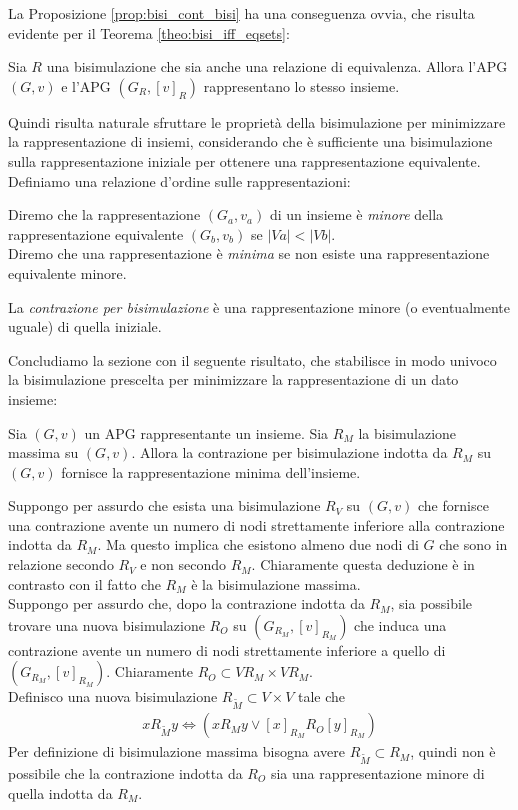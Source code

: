 La Proposizione \ref*{prop:bisi_cont_bisi} ha una conseguenza ovvia, che risulta evidente per il Teorema \ref*{theo:bisi_iff_eqsets}:
\begin{corollary}
    Sia $R$ una bisimulazione che sia anche una relazione di equivalenza. Allora l'APG $(G, v)$ e l'APG $(G_R, [v]_R)$ rappresentano lo stesso insieme.
\end{corollary}
Quindi risulta naturale sfruttare le proprietà della bisimulazione per minimizzare la rappresentazione di insiemi, considerando che è sufficiente una bisimulazione sulla rappresentazione iniziale per ottenere una rappresentazione equivalente. Definiamo una relazione d'ordine sulle rappresentazioni:
\begin{definition}
    Diremo che la rappresentazione $(G_a, v_a)$ di un insieme è \emph{minore} della rappresentazione equivalente $(G_b, v_b)$ se $|Va| < |Vb|$.\\
    Diremo che una rappresentazione è \emph{minima} se non esiste una rappresentazione equivalente minore.
\end{definition}
\begin{observation}
    La \emph{contrazione per bisimulazione} è una rappresentazione minore (o eventualmente uguale) di quella iniziale.
\end{observation}
Concludiamo la sezione con il seguente risultato, che stabilisce in modo univoco la bisimulazione prescelta per minimizzare la rappresentazione di un dato insieme:
\begin{theorem}
    Sia $(G,v)$ un APG rappresentante un insieme. Sia $R_M$ la bisimulazione massima su $(G,v)$. Allora la contrazione per bisimulazione indotta da $R_M$ su $(G,v)$ fornisce la rappresentazione minima dell'insieme.
\end{theorem}
\begin{proof2}
    Suppongo per assurdo che esista una bisimulazione $R_V$ su $(G,v)$ che fornisce una contrazione avente un numero di nodi strettamente inferiore alla contrazione indotta da $R_M$. Ma questo implica che esistono almeno due nodi di $G$ che sono in relazione secondo $R_V$ e non secondo $R_M$. Chiaramente questa deduzione è in contrasto con il fatto che $R_M$ è la bisimulazione massima.\\
    Suppongo per assurdo che, dopo la contrazione indotta da $R_M$, sia possibile trovare una nuova bisimulazione $R_O$ su $(G_{R_M}, [v]_{R_M})$ che induca una contrazione avente un numero di nodi strettamente inferiore a quello di $(G_{R_M}, [v]_{R_M})$. Chiaramente $R_O \subset V{R_M} \times V{R_M}$.\\
    Definisco una nuova bisimulazione $R_{\widetilde{M}} \subset V\times V$ tale che
    \begin{gather*}
        x R_{\widetilde{M}} y \iff (x R_M y \lor [x]_{R_M} R_O [y]_{R_M})
    \end{gather*}
    Per definizione di bisimulazione massima bisogna avere $R_{\widetilde{M}} \subset R_M$, quindi non è possibile che la contrazione indotta da $R_O$ sia una rappresentazione minore di quella indotta da $R_M$.
\end{proof2}

